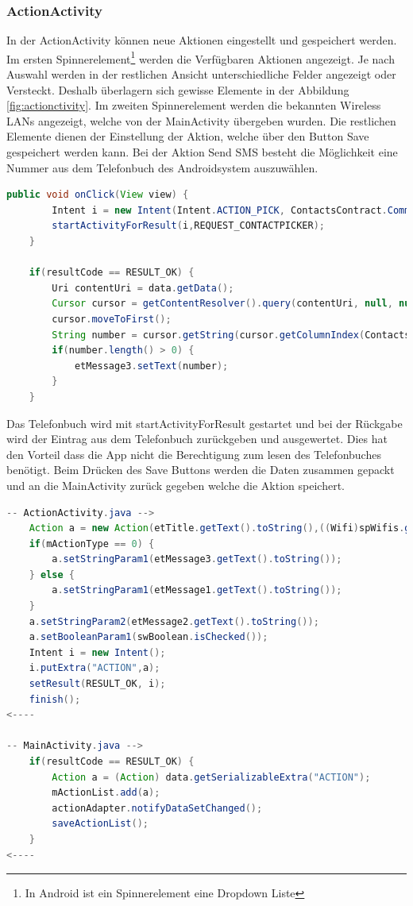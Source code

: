\subsubsection{ActionActivity}
In der ActionActivity können neue Aktionen eingestellt und gespeichert werden. Im ersten Spinnerelement\footnote{In Android ist ein Spinnerelement eine Dropdown Liste} werden die Verfügbaren Aktionen angezeigt. Je nach Auswahl werden in der restlichen Ansicht unterschiedliche Felder angezeigt oder Versteckt. Deshalb überlagern sich gewisse Elemente in der Abbildung \ref{fig:actionctivity}. Im zweiten Spinnerelement werden die bekannten Wireless LANs angezeigt, welche von der MainActivity übergeben wurden. Die restlichen Elemente dienen der Einstellung der Aktion, welche über den Button \glqq Save\grqq{} gespeichert werden kann. Bei der Aktion Send SMS besteht die Möglichkeit eine Nummer aus dem Telefonbuch des Androidsystem auszuwählen. \\
\begin{lstlisting}[language=Java]
    public void onClick(View view) {
        Intent i = new Intent(Intent.ACTION_PICK, ContactsContract.CommonDataKinds.Phone.CONTENT_URI);
        startActivityForResult(i,REQUEST_CONTACTPICKER);
    }

    if(resultCode == RESULT_OK) {
        Uri contentUri = data.getData();
        Cursor cursor = getContentResolver().query(contentUri, null, null, null, null);
        cursor.moveToFirst();
        String number = cursor.getString(cursor.getColumnIndex(ContactsContract.CommonDataKinds.Phone.NUMBER));
        if(number.length() > 0) {
            etMessage3.setText(number);
        }
    }
\end{lstlisting}
Das Telefonbuch wird mit startActivityForResult gestartet und bei der Rückgabe wird der Eintrag aus dem Telefonbuch zurückgeben und ausgewertet. Dies hat den Vorteil dass die App nicht die Berechtigung zum lesen des Telefonbuches benötigt. Beim Drücken des \glqq Save\grqq{} Buttons werden die Daten zusammen gepackt und an die MainActivity zurück gegeben welche die Aktion speichert. \\
\begin{lstlisting}[language=Java]
-- ActionActivity.java -->
	Action a = new Action(etTitle.getText().toString(),((Wifi)spWifis.getSelectedItem()).getSsid(), at,cbOnConnect.isChecked(),cbOnLeave.isChecked());
	if(mActionType == 0) {
	    a.setStringParam1(etMessage3.getText().toString());
	} else {
	    a.setStringParam1(etMessage1.getText().toString());
	}
	a.setStringParam2(etMessage2.getText().toString());
	a.setBooleanParam1(swBoolean.isChecked());
	Intent i = new Intent();
	i.putExtra("ACTION",a);
	setResult(RESULT_OK, i);
	finish();
<----

-- MainActivity.java -->
	if(resultCode == RESULT_OK) {
		Action a = (Action) data.getSerializableExtra("ACTION");
		mActionList.add(a);
		actionAdapter.notifyDataSetChanged();
		saveActionList();
	}
<----
\end{lstlisting}

